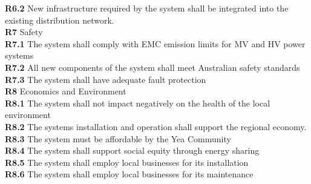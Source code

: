 \documentclass{article}
\begin{document}
\textbf{R6.2} New infrastructure required by the system shall be integrated into the existing distribution network. \\
\textbf{R7} Safety\\
\textbf{R7.1} The system shall comply with EMC emission limits for MV and HV power systems \\
\textbf{R7.2} All new components of the system shall meet Australian safety standards \\
\textbf{R7.3} The system shall have adequate fault protection \\
\textbf{R8} Economics and Environment\\
\textbf{R8.1} The system shall not impact negatively on the health of the local environment\\
\textbf{R8.2} The systems installation and operation shall support the regional economy. \\
\textbf{R8.3} The system must be affordable by the Yea Community \\
\textbf{R8.4} The system shall support social equity through energy sharing \\
\textbf{R8.5} The system shall employ local businesses for its installation\\ 
\textbf{R8.6} The system shall employ local businesses for its maintenance\\ 
\end{document}
